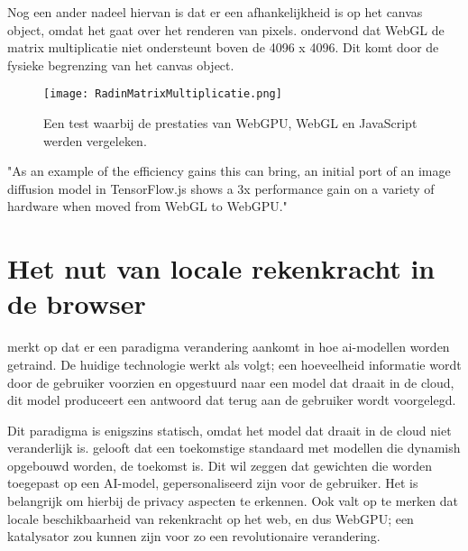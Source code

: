\bigbreak{}

Nog een ander nadeel hiervan is dat er een afhankelijkheid is op het canvas object, omdat het gaat over het renderen van pixels. \textcite{Radin2021} ondervond dat WebGL de matrix multiplicatie niet ondersteunt boven de 4096 x 4096. Dit komt door de fysieke begrenzing van het canvas object.

\begin{figure}
    \texttt{[image: RadinMatrixMultiplicatie.png]}
    \caption[Matrixvermenigvuldiging test \autocite{Radin2021}]{Een test waarbij de prestaties van WebGPU, WebGL en JavaScript werden vergeleken.  \autocite{Radin2021}}
    \label{fig:Matrix Multiplication By Radin}
\end{figure}

\bigbreak{}

\begin{displayquote}
    "As an example of the efficiency gains this can bring, an initial port of an image diffusion model in TensorFlow.js shows a 3x performance gain on a variety of hardware when moved from WebGL to WebGPU."
\end{displayquote}

\break{}

\section{Het nut van locale rekenkracht in de browser} 

\textcite{Fleetwood2022} merkt op dat er een paradigma verandering aankomt in hoe ai-modellen worden getraind. De huidige technologie werkt als volgt; een hoeveelheid informatie wordt door de gebruiker voorzien en opgestuurd naar een model dat draait in de cloud, dit model produceert een antwoord dat terug aan de gebruiker wordt voorgelegd.

\bigbreak{}

Dit paradigma is enigszins statisch, omdat het model dat draait in de cloud niet veranderlijk is. \textcite{Fleetwood2022} gelooft dat een toekomstige standaard met modellen die dynamish opgebouwd worden, de toekomst is. Dit wil zeggen dat gewichten die worden toegepast op een AI-model, gepersonaliseerd zijn voor de gebruiker. Het is belangrijk om hierbij de privacy aspecten te erkennen. Ook valt op te merken dat locale beschikbaarheid van rekenkracht op het web, en dus WebGPU; een katalysator zou kunnen zijn voor zo een revolutionaire verandering.

